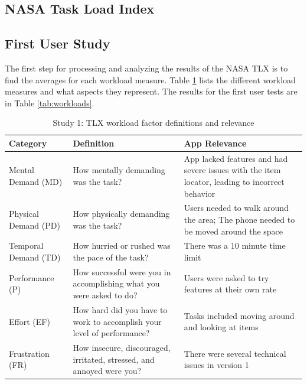 \documentclass[thesis]{fputhesis}
\newcommand{\ra}[1]{\renewcommand{\arraystretch}{#1}}
\begin{document}
\begin{body}
\section{NASA Task Load Index}
\subsection{First User Study}
The first step for processing and analyzing the results of the NASA TLX is to find the averages for each workload measure. Table \ref{tab:tlx-definitions} lists the different workload measures and what aspects they represent. The results for the first user tests are in Table \ref{tab:workloads}.

\begin{table}[h!]\centering
\caption{Study 1: TLX workload factor definitions and relevance}\label{tab:tlx-definitions}
\ra{1.3}
    \begin{tabular}{@{}l>{\raggedright\arraybackslash}p{}>{\raggedright\arraybackslash}p{}@{}}
    \toprule
        \textbf{Category} & \textbf{Definition} &   \textbf{App Relevance}  \\
    \midrule
        Mental Demand (MD)  &   How mentally demanding was the task?    &   App lacked features and had severe issues with the item locator, leading to incorrect behavior \\ 
        Physical Demand (PD)    &   How physically demanding was the task?  &   Users needed to walk around the area; The phone needed to be moved around the space \\
        Temporal Demand (TD)    &   How hurried or rushed was the pace of the task? &   There was a 10 minute time limit \\
        Performance (P) &   How successful were you in accomplishing what you were asked to do? &   Users were asked to try features at their own rate \\
        Effort (EF) &   How hard did you have to work to accomplish your level of performance? &    Tasks included moving around and looking at items   \\
        Frustration (FR)    &   How insecure, discouraged, irritated, stressed, and annoyed were you?    &   There were several technical issues in version 1 \\
    \bottomrule
    \end{tabular}%
\end{table}


\end{body}
\end{document}
